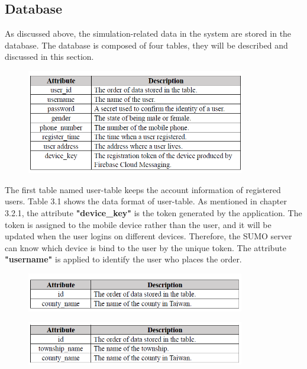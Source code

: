 \documentclass[12pt]{ksthesis}
\begin{document}
\begin{thesis}
{\section{Database}
As discussed above, the simulation-related data in the system are stored in the database. The database is composed of four tables, they will be described and discussed in this section.

\begin{figure}[H]
\centering
{}
\includegraphics[width=0.85\textwidth]{./figures/Table3-1-UserTable.PNG}

\vspace{0.5cm}
\label{Fig:UserTable}
\end{figure}

 
The first table named user-table keeps the account information of registered users. Table 3.1 shows the data format of user-table. As mentioned in chapter 3.2.1, the attribute \textbf{"device\_key"} is the token generated by the application. The token is assigned to the mobile device rather than the user, and it will be updated when the user logins on different devices. Therefore, the SUMO server can know which device is bind to the user by the unique token. The attribute \textbf{"username"} is applied to identify the user who places the order. 

\begin{figure}[H]
\centering
{}
\includegraphics[width=0.85\textwidth]{./figures/Table3-2-CountyTable.PNG}
\vspace{0.5cm}
\label{Fig:CountyTable}
\end{figure}

\begin{figure}[H]
\centering
{}
\includegraphics[width=0.85\textwidth]{./figures/Table3-3-TownshipTable.PNG}
\vspace{0.5cm}
\label{Fig:TownshipTable}
\end{figure}

}
\end{thesis}
\end{document}
